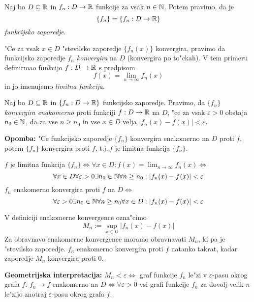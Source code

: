  Naj bo $D \subseteq \mathbb{R}$ in $f_n : D \to \mathbb{R}$ funkcije za vsak $n \in \mathbb{N}$. Potem pravimo, da je
\begin{equation*}
\{f_n\} = \{f_n: D \to \mathbb{R}\}
\end{equation*}
\emph{funkcijsko zaporedje}.

"Ce za vsak $x \in D$ "stevilsko zaporedje $\{f_n(x)\}$ konvergira, pravimo da funkcijsko zaporedje $f_n$ \emph{konvergira} na $D$ (konvergira po to"ckah). V tem primeru definirmao funkcijo $f: D \to \mathbb{R}$ s predpisom
\begin{equation*}
f(x) = \lim_{n \to \infty} f_n(x)
\end{equation*}
in jo imenujemo \emph{limitna funkcija}.

 Naj bo $D \subseteq \mathbb{R}$ in $\{f_n: D \to \mathbb{R} \}$ funkcijsko zaporedje. Pravimo, da $\{f_n\}$ \emph{konvergira enakomerno} proti funkciji $f: D \to \mathbb{R}$ na $D$, "ce za vsak $\varepsilon > 0$ obstaja $n_0 \in \mathbb{N}$, da za vse $n \geq n_0$ in vse $x \in D$ velja $|f_n (x) - f(x)| < \varepsilon$.

\textbf{Opomba:} "Ce funkcijsko zaporedje $\{ f_n \}$ konvergira enakomerno na $D$ proti $f$, potem $\{ f_n \}$ konvergira proti $f$, t.j.\,$f$ je limitna funkcija $\{ f_n \}$.

$f$ je limitna funkcija $\{ f_n \} \iff \forall x \in D: f(x) = \lim_{n \to \infty} f_n(x) \iff$
\begin{equation*}
\forall x \in D \forall \varepsilon > 0 \exists n_0 \in \mathbb{N} \forall n \geq n_0 : |f_n(x) - f(x)| < \varepsilon
\end{equation*}
$f_n$ enakomerno konvergira proti $f$ na $D \iff$
\begin{equation*}
\forall \varepsilon > 0 \exists n_0 \in \mathbb{N} \forall n \geq n_0 \forall x \in D: |f_n(x) - f(x)| < \varepsilon
\end{equation*}

V definiciji enakomerne konvergence ozna"cimo
\begin{equation*}
M_n := \sup_{x \in D} |f_n (x) - f(x)|
\end{equation*}
Za obravnavo enakomerne konvergence moramo obravnavati $M_n$, ki pa je "stevilsko zaporedje. $f_n$ enakomerno konvergira proti $f$ natanko takrat, kadar zaporedje $M_n$ konvergira proti 0.

\textbf{Geometrijska interpretacija:} $M_n < \varepsilon \iff$ graf funkcije $f_n$ le"zi v $\varepsilon$-pasu okrog grafa $f$. $f_n \to f$ enakomerno na $D \iff \forall \varepsilon > 0$ vsi grafi funkcije $f_n$ za dovolj velik $n$ le"zijo znotraj $\varepsilon$-pasu okrog grafa $f$.

